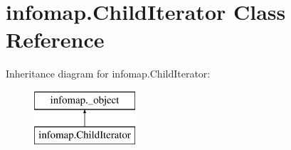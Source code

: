 \hypertarget{classinfomap_1_1ChildIterator}{}\section{infomap.\+Child\+Iterator Class Reference}
\label{classinfomap_1_1ChildIterator}
Inheritance diagram for infomap.\+Child\+Iterator\+:\begin{figure}[H]
\begin{center}
\leavevmode
\includegraphics[height=2.000000cm]{classinfomap_1_1ChildIterator}
\end{center}
\end{figure}
